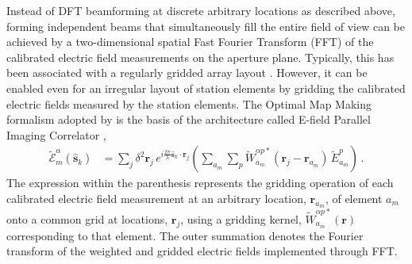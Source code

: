 \documentclass[
  journal=pasa,
  manuscript=article-type,
  year=2020,
  volume=37,
]{cup-journal}
\begin{document}
Instead of DFT beamforming at discrete arbitrary locations as described above, forming independent beams that simultaneously fill the entire field of view can be achieved by a two-dimensional spatial Fast Fourier Transform (FFT) of the calibrated electric field measurements on the aperture plane. Typically, this has been associated with a regularly gridded array layout \citep{Daishido+1991,Otobe+1994,Tegmark+2009,Tegmark+2010,Foster+2014,Masui+2019}. However, it can be enabled even for an irregular layout of station elements by gridding the calibrated electric fields measured by the station elements. The Optimal Map Making \citep[OMM;][]{Tegmark1997a} formalism adopted by \citet{Morales2011} is the basis of the architecture called E-field Parallel Imaging Correlator \cite[EPIC;][]{Thyagarajan+2017},
\begin{align}
    \widetilde{\mathcal{E}}_m^\alpha(\hat{\boldsymbol{s}}_k) &= \sum_j \delta^2 \boldsymbol{r}_j \, e^{i\frac{2\pi}{\lambda} \hat{\boldsymbol{s}}_k\cdot\boldsymbol{r}_j} \left(\sum_{a_m} \sum_p \widetilde{W}_{a_m}^{\alpha p*}(\boldsymbol{r}_j-\boldsymbol{r}_{a_m}) \, \widetilde{E}_{a_m}^p \right) \, . \label{eqn:intra-station-pol-hol-img-epic}
\end{align}
The expression within the parenthesis represents the gridding operation of each calibrated electric field measurement at an arbitrary location, $\boldsymbol{r}_{a_m}$, of element $a_m$ onto a common grid at locations, $\boldsymbol{r}_j$, using a gridding kernel, $\widetilde{W}_{a_m}^{\alpha p*}(\boldsymbol{r})$ corresponding to that element. The outer summation denotes the Fourier transform of the weighted and gridded electric fields implemented through FFT. 
\end{document}
